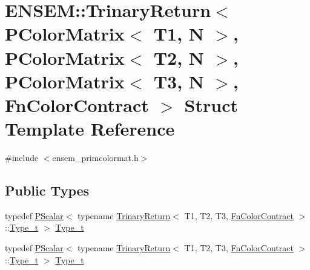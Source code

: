 \hypertarget{structENSEM_1_1TrinaryReturn_3_01PColorMatrix_3_01T1_00_01N_01_4_00_01PColorMatrix_3_01T2_00_01N1d3d49ae4a9604208f2204d046c31000}{}\section{E\+N\+S\+EM\+:\+:Trinary\+Return$<$ P\+Color\+Matrix$<$ T1, N $>$, P\+Color\+Matrix$<$ T2, N $>$, P\+Color\+Matrix$<$ T3, N $>$, Fn\+Color\+Contract $>$ Struct Template Reference}
\label{structENSEM_1_1TrinaryReturn_3_01PColorMatrix_3_01T1_00_01N_01_4_00_01PColorMatrix_3_01T2_00_01N1d3d49ae4a9604208f2204d046c31000}


{\ttfamily \#include $<$ensem\+\_\+primcolormat.\+h$>$}

\subsection*{Public Types}
\begin{DoxyCompactItemize}
\item 
typedef \mbox{\hyperlink{classENSEM_1_1PScalar}{P\+Scalar}}$<$ typename \mbox{\hyperlink{structENSEM_1_1TrinaryReturn}{Trinary\+Return}}$<$ T1, T2, T3, \mbox{\hyperlink{structENSEM_1_1FnColorContract}{Fn\+Color\+Contract}} $>$\+::\mbox{\hyperlink{structENSEM_1_1TrinaryReturn_3_01PColorMatrix_3_01T1_00_01N_01_4_00_01PColorMatrix_3_01T2_00_01N1d3d49ae4a9604208f2204d046c31000_a500f79d698086c137c97b0ae66f14090}{Type\+\_\+t}} $>$ \mbox{\hyperlink{structENSEM_1_1TrinaryReturn_3_01PColorMatrix_3_01T1_00_01N_01_4_00_01PColorMatrix_3_01T2_00_01N1d3d49ae4a9604208f2204d046c31000_a500f79d698086c137c97b0ae66f14090}{Type\+\_\+t}}
\item 
typedef \mbox{\hyperlink{classENSEM_1_1PScalar}{P\+Scalar}}$<$ typename \mbox{\hyperlink{structENSEM_1_1TrinaryReturn}{Trinary\+Return}}$<$ T1, T2, T3, \mbox{\hyperlink{structENSEM_1_1FnColorContract}{Fn\+Color\+Contract}} $>$\+::\mbox{\hyperlink{structENSEM_1_1TrinaryReturn_3_01PColorMatrix_3_01T1_00_01N_01_4_00_01PColorMatrix_3_01T2_00_01N1d3d49ae4a9604208f2204d046c31000_a500f79d698086c137c97b0ae66f14090}{Type\+\_\+t}} $>$ \mbox{\hyperlink{structENSEM_1_1TrinaryReturn_3_01PColorMatrix_3_01T1_00_01N_01_4_00_01PColorMatrix_3_01T2_00_01N1d3d49ae4a9604208f2204d046c31000_a500f79d698086c137c97b0ae66f14090}{Type\+\_\+t}}
\end{DoxyCompactItemize}


